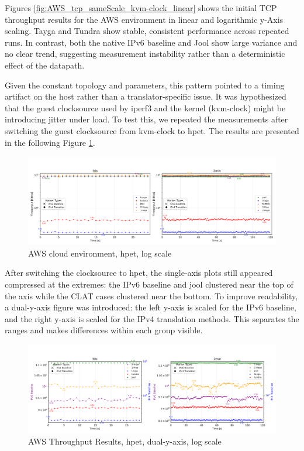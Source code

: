 Figures \ref{fig:AWS_tcp_sameScale_kvm-clock_linear} shows the initial TCP throughput results for the AWS environment in linear and logarithmic y-Axis scaling. Tayga and Tundra show stable, consistent performance across repeated runs. 
In contrast, both the native IPv6 baseline and Jool show large variance and no clear trend, suggesting measurement instability rather than a deterministic effect of the datapath.

Given the constant topology and parameters, this pattern pointed to a timing artifact on the host rather than a translator-specific issue. It was hypothesized that the guest clocksource used by iperf3 and the kernel (kvm-clock) might be introducing jitter under load. To test this, we repeated the measurements after switching the guest clocksource from kvm-clock to hpet. 
The results are presented in the following Figure \ref{fig:AWS_tcp_sameScale_hpet_log}.

\begin{figure}[H]
    \centering
    \includegraphics[width=1\textwidth]{resources/plots/CombinedPlot/TCP/AWS_tcp_sameScale_hpet_log.png}
    \caption{AWS cloud environment, hpet, log scale}
    \label{fig:AWS_tcp_sameScale_hpet_log}

\end{figure}

After switching the clocksource to hpet, the single-axis plots still appeared compressed at the extremes: the IPv6 baseline and jool clustered near the top of the axis while the CLAT cases clustered near the bottom. To improve readability, a dual-y-axis figure was introduced: the left y‑axis is scaled for the IPv6 baseline, and the right y‑axis is scaled for the IPv4 translation methods. This separates the ranges and makes differences within each group visible.

\begin{figure}[H]
    \centering
    \includegraphics[width=1\textwidth]{resources/plots/JitterPlot/AWS_tcp_dualAxis_hpet_log.png}
    \caption{AWS Throughput Results, hpet, dual-y-axis, log scale}
    \label{fig:AWS_tcp_dualAxis_hpet_log}
\end{figure}

